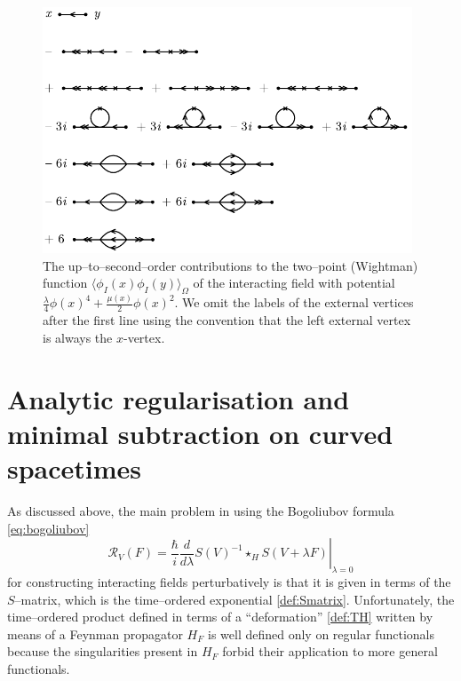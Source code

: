 \documentclass[a4paper,10pt,twoside]{article}
\numberwithin{equation}{section}
\newcounter{and}
\theoremstyle{plain}
\theoremstyle{definition}
\begin{document}
\begin{figure}[!htb]\begin{center}
\includegraphics[width=11cm]{fig_2pf}
\end{center}
\caption{\label{fig_2pf}The up--to--second--order contributions to the two--point (Wightman) function $\langle\phi_I(x)\phi_I(y)\rangle_\Omega$ of the interacting field with potential $\frac{\lambda}{4}\phi(x)^4+\frac{\mu(x)}{2}\phi(x)^2$. We omit the labels of the external vertices after the first line using the convention that the left external vertex is always the $x$-vertex.}
\end{figure}

 

\section{Analytic regularisation and minimal subtraction on curved spacetimes}

As discussed above, the main problem in using the Bogoliubov formula \eqref{eq:bogoliubov}
\[
\mathcal{R}_V(F) = \left. \frac{\hbar}{i}\frac{d}{d\lambda} S(V)^{-1}\star_H S(V+\lambda F) \right|_{\lambda = 0}
\]
for constructing interacting fields perturbatively is that it is given in terms of the $S$--matrix, which is the time--ordered exponential \eqref{def:Smatrix}. 
Unfortunately, the time--ordered product defined in terms of a ``deformation'' \eqref{def:TH} written by means of a Feynman propagator $H_F$ is well defined only on regular functionals because  
the singularities present in $H_F$ forbid their application to more general functionals. 
\end{document}
